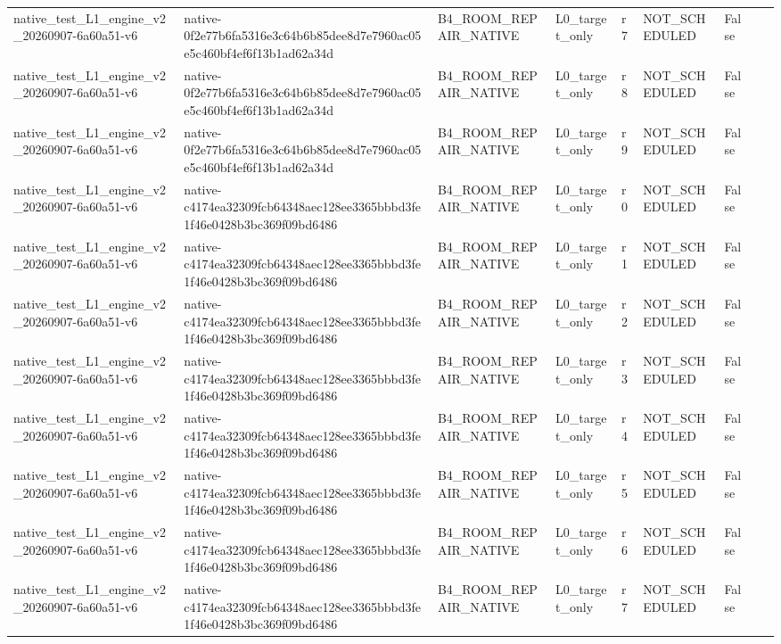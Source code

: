 \begin{tabular}{lllllllll}
native\_test\_L1\_engine\_v2\_20260907-6a60a51-v6 & native-0f2e77b6fa5316e3c64b6b85dee8d7e7960ac05e5c460bf4ef6f13b1ad62a34d & B4\_ROOM\_REPAIR\_NATIVE & L0\_target\_only & r7 & NOT\_SCHEDULED & False &  &  \\
native\_test\_L1\_engine\_v2\_20260907-6a60a51-v6 & native-0f2e77b6fa5316e3c64b6b85dee8d7e7960ac05e5c460bf4ef6f13b1ad62a34d & B4\_ROOM\_REPAIR\_NATIVE & L0\_target\_only & r8 & NOT\_SCHEDULED & False &  &  \\
native\_test\_L1\_engine\_v2\_20260907-6a60a51-v6 & native-0f2e77b6fa5316e3c64b6b85dee8d7e7960ac05e5c460bf4ef6f13b1ad62a34d & B4\_ROOM\_REPAIR\_NATIVE & L0\_target\_only & r9 & NOT\_SCHEDULED & False &  &  \\
native\_test\_L1\_engine\_v2\_20260907-6a60a51-v6 & native-c4174ea32309fcb64348aec128ee3365bbbd3fe1f46e0428b3bc369f09bd6486 & B4\_ROOM\_REPAIR\_NATIVE & L0\_target\_only & r0 & NOT\_SCHEDULED & False &  &  \\
native\_test\_L1\_engine\_v2\_20260907-6a60a51-v6 & native-c4174ea32309fcb64348aec128ee3365bbbd3fe1f46e0428b3bc369f09bd6486 & B4\_ROOM\_REPAIR\_NATIVE & L0\_target\_only & r1 & NOT\_SCHEDULED & False &  &  \\
native\_test\_L1\_engine\_v2\_20260907-6a60a51-v6 & native-c4174ea32309fcb64348aec128ee3365bbbd3fe1f46e0428b3bc369f09bd6486 & B4\_ROOM\_REPAIR\_NATIVE & L0\_target\_only & r2 & NOT\_SCHEDULED & False &  &  \\
native\_test\_L1\_engine\_v2\_20260907-6a60a51-v6 & native-c4174ea32309fcb64348aec128ee3365bbbd3fe1f46e0428b3bc369f09bd6486 & B4\_ROOM\_REPAIR\_NATIVE & L0\_target\_only & r3 & NOT\_SCHEDULED & False &  &  \\
native\_test\_L1\_engine\_v2\_20260907-6a60a51-v6 & native-c4174ea32309fcb64348aec128ee3365bbbd3fe1f46e0428b3bc369f09bd6486 & B4\_ROOM\_REPAIR\_NATIVE & L0\_target\_only & r4 & NOT\_SCHEDULED & False &  &  \\
native\_test\_L1\_engine\_v2\_20260907-6a60a51-v6 & native-c4174ea32309fcb64348aec128ee3365bbbd3fe1f46e0428b3bc369f09bd6486 & B4\_ROOM\_REPAIR\_NATIVE & L0\_target\_only & r5 & NOT\_SCHEDULED & False &  &  \\
native\_test\_L1\_engine\_v2\_20260907-6a60a51-v6 & native-c4174ea32309fcb64348aec128ee3365bbbd3fe1f46e0428b3bc369f09bd6486 & B4\_ROOM\_REPAIR\_NATIVE & L0\_target\_only & r6 & NOT\_SCHEDULED & False &  &  \\
native\_test\_L1\_engine\_v2\_20260907-6a60a51-v6 & native-c4174ea32309fcb64348aec128ee3365bbbd3fe1f46e0428b3bc369f09bd6486 & B4\_ROOM\_REPAIR\_NATIVE & L0\_target\_only & r7 & NOT\_SCHEDULED & False &  &  \\

\end{tabular}
